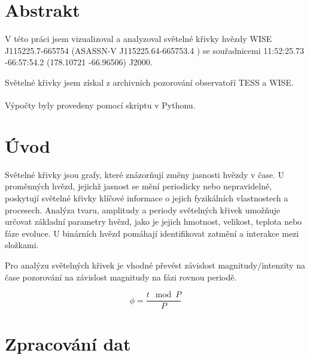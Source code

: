 \documentclass[a4paper,11pt,twocolumn]{article}
\begin{document}

    \vskip10pt
    \section{Abstrakt}
        V této práci jsem vizualizoval a analyzoval světelné křivky hvězdy WISE J115225.7-665754 (ASASSN-V J115225.64-665753.4 ) se souřadnicemi 11:52:25.73 -66:57:54.2 (178.10721 -66.96506) J2000. 

        Světelné křivky jsem získal z archivních pozorování observatoří TESS a WISE. 
        
        Výpočty byly provedeny pomocí skriptu v Pythonu\textsuperscript{\cite{github}}.
    \section{Úvod}
        Světelné křivky jsou grafy, které znázorňují změny jasnosti hvězdy v čase. U proměnných hvězd, jejichž jasnost se mění periodicky nebo nepravidelně, poskytují světelné křivky klíčové informace o jejich fyzikálních vlastnostech a procesech. Analýza tvaru, amplitudy a periody světelných křivek umožňuje určovat základní parametry hvězd, jako je jejich hmotnost, velikost, teplota nebo fáze evoluce. U binárních hvězd pomáhají identifikovat zatmění a interakce mezi složkami. 

        Pro analýzu světelných křivek je vhodné převést závislost magnitudy/intenzity na čase pozorování na závislost magnitudy na fázi rovnou periodě. 

        \begin{equation}
            \phi = \frac{t \mod P}{P}
        \end{equation}
        
    \section{Zpracování dat}
\end{document}
